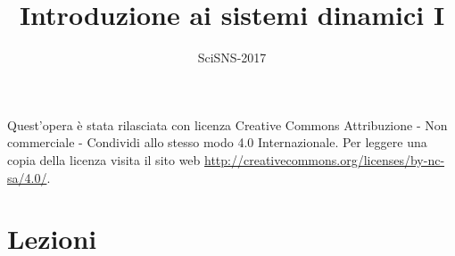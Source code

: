 \documentclass[a4paper]{scrbook}
\title{Introduzione ai sistemi dinamici I}
\author{SciSNS-2017}
\newif\iffigureon
\theoremstyle{definition}
\theoremstyle{remark}
\theoremstyle{plain}
\numberwithin{equation}{chapter}
\begin{document}
\frontmatter

\maketitle

Quest'opera è stata rilasciata con licenza Creative Commons Attribuzione - Non commerciale - Condividi allo stesso modo 4.0 Internazionale. Per leggere una copia della licenza visita il sito web \url{http://creativecommons.org/licenses/by-nc-sa/4.0/}.
\iffigureon
\begin{center}
  \href{http://creativecommons.org/licenses/by-nc-sa/4.0/}{\texttt{[image: img/by-nc-sa]}}
\end{center}
\fi


\tableofcontents


\mainmatter

\chapter{Lezioni}










%
\end{document}
